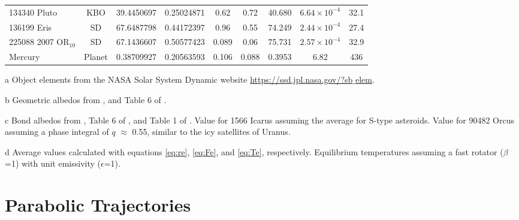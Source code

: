 \documentclass[a4paper,fleqn,usenatbib]{mnras}
\begin{document}
\begin{table}
\begin{threeparttable}
\begin{tabular}{ l c c c c c c c c }
 134340 Pluto & KBO & 39.4450697 & 0.25024871 & 0.62 & 0.72 & 40.680 & $6.64\times10^{-4}$ & 32.1 \\
 136199 Eris & SD & 67.6487798 & 0.44172397 & 0.96 & 0.55 & 74.249 & $2.44\times10^{-4}$ & 27.4 \\
 225088	2007 OR$_{10}$ & SD & 67.1436607 & 0.50577423 & 0.089 & 0.06 & 75.731 & $2.57\times10^{-4}$ & 32.9 \\
 Mercury & Planet & 0.38709927 & 0.20563593 & 0.106 & 0.088 & 0.3953 & 6.82 & 436 \\
 \hline
 \hline
\end{tabular}
\label{tab:elliptic}
	\begin{tablenotes}
	\small
\item[a]{Object elements from the NASA Solar System Dynamic website \href{https://ssd.jpl.nasa.gov/?sb$\_$elem}{https://ssd.jpl.nasa.gov/?sb$\_$elem}.}
\item[b] {Geometric albedos from \citet{2004come.book..223L,2010AJ....139.2700B,2011Natur.478..493S,2012A&A...541L...6P,2015ApJ...814..117N,2015Sci...347a0628C,2015Icar..252..393T,2016AJ....151..117P}, and Table 6 of \citet{2013Icar..226.1252L}.}
\item[c] {Bond albedos from \citet{1981motc.conf...83C,1987Icar...69...33H,2004Icar..167..129B,2010AJ....139.2700B,2011Natur.478..493S,2015Icar..252..393T,2017arXiv170302670M,2017Icar..287..207B}, Table 6 of \citet{2013Icar..226.1252L}, and Table 1 of \citet{2015ApJ...809...43J}. Value for 1566 Icarus assuming the average for S-type asteroids. Value for 90482 Orcus assuming a phase integral of $q$ $\approx$ 0.55, similar to the icy satellites of Uranus.}
\item[d]{Average values calculated with equations \ref{eq:re}, \ref{eq:Fe}, and \ref{eq:Te}, respectively. Equilibrium temperatures assuming a fast rotator ($\beta$=1) with unit emissivity ($\epsilon$=1).}
	\end{tablenotes}
\end{threeparttable}
\end{table}


\section{Parabolic Trajectories}
\label{sec:parabolic}

\end{document}
